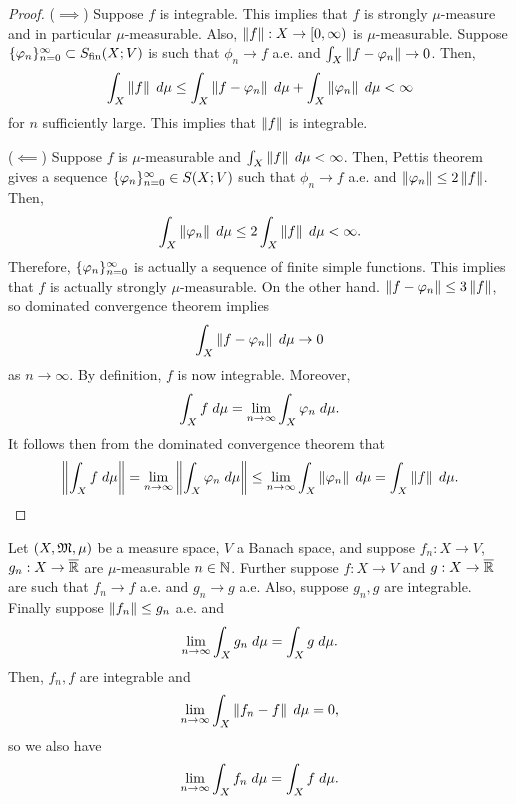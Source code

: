 \documentclass[a4paper]{article}
\begin{document}
\begin{proof}
($\implies$) Suppose $f$ is integrable. This implies that 
$f$ is strongly $\mu$-measure and in particular $\mu$-measurable.
Also, $\left\lVert f\right\rVert : X \to [0, \infty)$ is $\mu$-measurable. 
Suppose $\{ \varphi_n \}_{n=0}^\infty \subset S_{\text{fin}}(X; V)$ is such that 
$\phi_n \to f$ a.e. and $\int_X \left\lVert f - \varphi_n\right\rVert \to 0$.
Then, 
\[
\begin{aligned}
\int_X \left\lVert f\right\rVert \; d \mu 
\leq \int_X \left\lVert f - \varphi_n\right\rVert \; d \mu + \int_X \left\lVert \varphi_n\right\rVert
\; d \mu < \infty
\end{aligned}
\]
for $n$ sufficiently large. This implies that $\left\lVert f\right\rVert$
is integrable.

($\impliedby$) Suppose $f$ is $\mu$-measurable and 
$\int_X \left\lVert f\right\rVert \; d \mu < \infty$. Then, Pettis theorem 
gives a sequence $\{ \varphi_n \}_{n=0}^\infty \in S(X; V)$ such that 
$\phi_n \to f$ a.e. and $\left\lVert \varphi_n\right\rVert \leq 2\left\lVert f\right\rVert$.
Then, 
\[
\int_X \left\lVert \varphi_n\right\rVert \; d \mu \leq 2 \int_X \left\lVert f\right\rVert \; d \mu 
< \infty.
\]
Therefore, $\{ \varphi_n \}_{n=0}^\infty$ is actually a sequence of 
finite simple functions. This implies that 
$f$ is actually strongly $\mu$-measurable. On the other hand. 
$\left\lVert f - \varphi_n\right\rVert \leq 3\left\lVert f\right\rVert$, so 
dominated convergence theorem implies 
\[
\int_X \left\lVert f - \varphi_n\right\rVert \; d \mu \to 0
\]
as $n \to \infty$. By definition, $f$ is now integrable.
Moreover, 
\[
\int_X f \; d \mu = \lim_{n \to \infty} \int_X \varphi_n \; d \mu.
\]
It follows then from the dominated convergence theorem that 
\[
\begin{aligned}
\left\lVert \int_X f \; d \mu\right\rVert 
= \lim_{n \to \infty} \left\lVert \int_X \varphi_n \; d \mu\right\rVert  
\leq \lim_{n \to \infty} \int_X \left\lVert \varphi_n\right\rVert \; d \mu
= \int_X \left\lVert f\right\rVert \; d \mu.
\end{aligned}
\]
\end{proof}

\begin{thm}
Let $(X, \mathfrak{M}, \mu)$ be a measure space, $V$ a Banach space,
and suppose $f_n : X \to V$, $g_n : X \to \overline{\mathbb{R}}$ are 
$\mu$-measurable $n \in \mathbb{N}$. Further suppose 
$f: X \to V$ and $g: X \to \overline{\mathbb{R}}$ are such that 
$f_n \to f$ a.e. and $g_n \to g$ a.e. 
Also, suppose $g_n, g$ are integrable.
Finally suppose 
$\left\lVert f_n\right\rVert \leq g_n$ a.e. and 
\[
\lim_{n \to \infty} \int_X g_n \; d \mu = \int_X g \; d \mu.
\]
Then, $f_n, f$ are integrable and 
\[
\lim_{n \to \infty} \int_X \left\lVert f_n - f\right\rVert \; d \mu = 0,
\]
so we also have 
\[
\lim_{n \to \infty} \int_X f_n \; d \mu = \int_X f \; d \mu.
\]
\end{thm}
\end{document}
